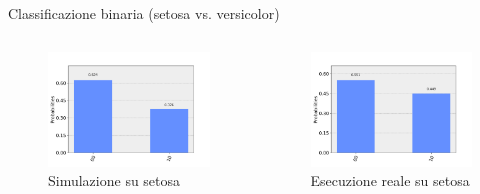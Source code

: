 \documentclass{beamer}
\begin{document}
    \begin{frame}{Classificazione binaria (setosa vs. versicolor)}
        \begin{columns}
            \begin{figure}[h]
                \centering
                \includegraphics[width=\textwidth]{gfx/misura_setosa_filtrata_20191015_1145.png}
                \caption{Simulazione su setosa}
                \label{fig:simulazione.setosa}
            \end{figure}
            \begin{figure}[h]
                \centering
                \includegraphics[width=\textwidth]{gfx/misura_setosa_sperimentale.png}
                \caption{Esecuzione reale su setosa}
                \label{fig:esecuzione.setosa}
            \end{figure}
        \end{columns}
    \end{frame}
\end{document}
